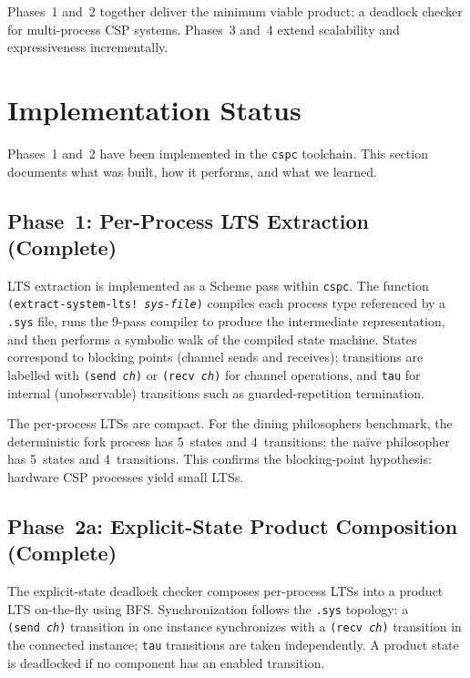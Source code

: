\documentclass[11pt]{article}
\begin{document}
Phases~1 and~2 together deliver the minimum viable product: a deadlock
checker for multi-process CSP systems.  Phases~3 and~4 extend
scalability and expressiveness incrementally.

\section{Implementation Status}

Phases~1 and~2 have been implemented in the \texttt{cspc} toolchain.
This section documents what was built, how it performs, and what
we learned.

\subsection{Phase~1: Per-Process LTS Extraction (Complete)}

LTS extraction is implemented as a Scheme pass within \texttt{cspc}.
The function \texttt{(extract-system-lts!~\textit{sys-file})} compiles
each process type referenced by a \texttt{.sys} file, runs the 9-pass
compiler to produce the intermediate representation, and then performs a
symbolic walk of the compiled state machine.  States correspond to
blocking points (channel sends and receives); transitions are labelled
with \texttt{(send~\textit{ch})} or \texttt{(recv~\textit{ch})} for
channel operations, and \texttt{tau} for internal (unobservable)
transitions such as guarded-repetition termination.

The per-process LTSs are compact.  For the dining philosophers
benchmark, the deterministic fork process has 5~states and 4~transitions;
the na\"ive philosopher has 5~states and 4~transitions.  This confirms
the blocking-point hypothesis: hardware CSP processes yield small LTSs.

\subsection{Phase~2a: Explicit-State Product Composition (Complete)}

The explicit-state deadlock checker composes per-process LTSs into a
product LTS on-the-fly using BFS.  Synchronization follows the
\texttt{.sys} topology: a \texttt{(send~\textit{ch})} transition in one
instance synchronizes with a \texttt{(recv~\textit{ch})} transition in
the connected instance; \texttt{tau} transitions are taken independently.
A product state is deadlocked if no component has an enabled transition.
\end{document}
